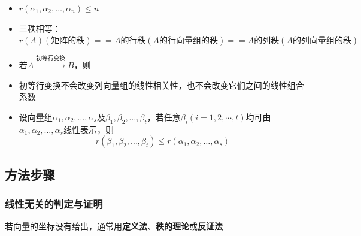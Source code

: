 \documentclass[./linear_algebra.tex]{subfiles}
\begin{document}
\begin{enumerate}
\begin{itemize}
            \item $r(\alpha_1, \alpha_2, \dots, \alpha_n) \le n$
            \item 三秩相等：$r(A)(\text{矩阵的秩}) == A\text{的行秩}(A\text{的行向量组的秩}) == A\text{的列秩}(A\text{的列向量组的秩})$
            \item 若$A \xrightarrow{\text{初等行变换}} B$，则
            \item 初等行变换不会改变列向量组的线性相关性，也不会改变它们之间的线性组合系数
            \item 设向量组$\alpha_1, \alpha_2, \dots, \alpha_s$及$\beta_1, \beta_2, \dots, \beta_t$，若任意$\beta_i(i = 1, 2, \cdots, t)$均可由$\alpha_1, \alpha_2, \dots, \alpha_s$线性表示，则
            \[
                r(\beta_1, \beta_2, \dots, \beta_t) \leq r(\alpha_1, \alpha_2, \dots, \alpha_s)
            \]
        \end{itemize}
    \end{enumerate}

    \subsection{方法步骤}

    \subsubsection{线性无关的判定与证明}

    若向量的坐标没有给出，通常用\textbf{定义法}、\textbf{秩的理论}或\textbf{反证法}
\end{document}
